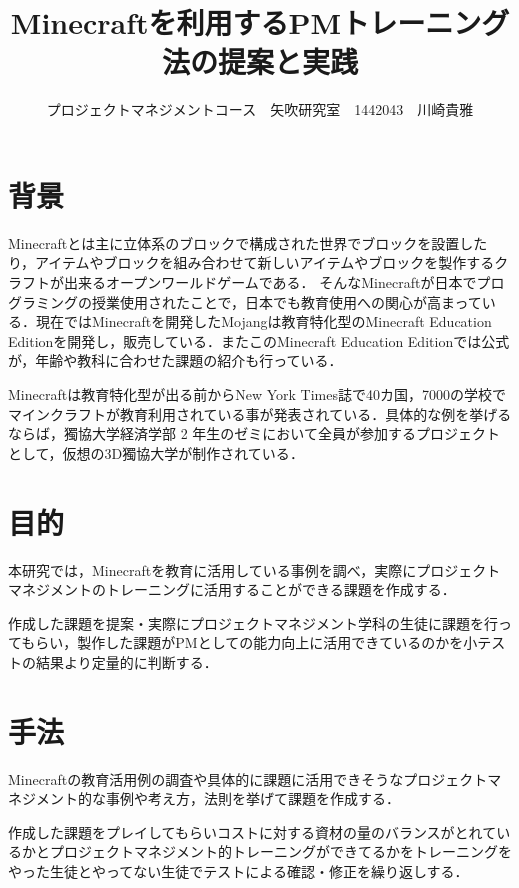 \documentclass[uplatex,twocolumn,dvipdfmx]{jsarticle}
\title{\vspace{-5mm}\fontsize{14pt}{0pt}\selectfont Minecraftを利用するPMトレーニング法の提案と実践}
\author{\normalsize プロジェクトマネジメントコース　矢吹研究室　1442043　川崎貴雅}
\date{}
\begin{document}
\fontsize{10.5pt}{\baselineskip}\selectfont
\maketitle





\section{背景}

Minecraftとは主に立体系のブロックで構成された世界でブロックを設置したり，アイテムやブロックを組み合わせて新しいアイテムやブロックを製作するクラフトが出来るオープンワールドゲームである．
そんなMinecraftが日本でプログラミングの授業使用されたことで，日本でも教育使用への関心が高まっている．現在ではMinecraftを開発したMojangは教育特化型のMinecraft Education Editionを開発し，販売している．またこのMinecraft Education Editionでは公式が，年齢や教科に合わせた課題の紹介も行っている\cite{self}．


Minecraftは教育特化型が出る前からNew York Times誌で40カ国，7000の学校でマインクラフトが教育利用されている事が発表されている．具体的な例を挙げるならば，獨協大学経済学部 2 年生のゼミにおいて全員が参加するプロジェクトとして，仮想の3D獨協大学が制作されている\cite{ 110009684401}．




\section{目的}
本研究では，Minecraftを教育に活用している事例を調べ，実際にプロジェクトマネジメントのトレーニングに活用することができる課題を作成する．


作成した課題を提案・実際にプロジェクトマネジメント学科の生徒に課題を行ってもらい，製作した課題がPMとしての能力向上に活用できているのかを小テストの結果より定量的に判断する．

\section{手法}
Minecraftの教育活用例の調査や具体的に課題に活用できそうなプロジェクトマネジメント的な事例や考え方，法則を挙げて課題を作成する．

作成した課題をプレイしてもらいコストに対する資材の量のバランスがとれているかとプロジェクトマネジメント的トレーニングができてるかをトレーニングをやった生徒とやってない生徒でテストによる確認・修正を繰り返しする．
\end{document}

